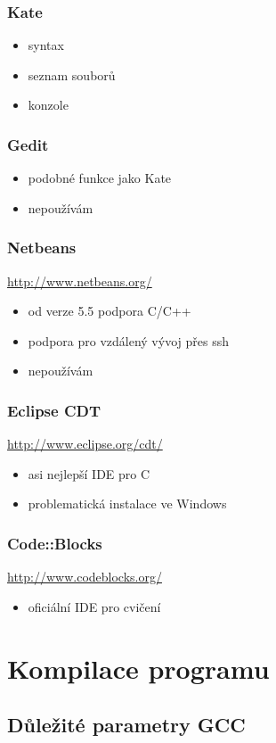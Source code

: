 	\begin{frame}
		\frametitle{Kate}
		\begin{itemize}
			\item{syntax}
			\item{seznam souborů}
			\item{konzole}
		\end{itemize}
	\end{frame}

	\begin{frame}
		\frametitle{Gedit}
		\begin{itemize}
			\item{podobné funkce jako Kate}
			\item{nepoužívám}
		\end{itemize}
	\end{frame}

	\begin{frame}
		\frametitle{Netbeans}
		\href{http://www.netbeans.org/}{http://www.netbeans.org/}
		\begin{itemize}
			\item{od verze 5.5 podpora C/C++}
			\item{podpora pro vzdálený vývoj přes ssh}
			\item{nepoužívám}
		\end{itemize}
	\end{frame}

	\begin{frame}
		\frametitle{Eclipse CDT}
		\href{http://www.eclipse.org/cdt/}{http://www.eclipse.org/cdt/}
		\begin{itemize}
			\item{asi nejlepší IDE pro C}
			\item{problematická instalace ve Windows}
		\end{itemize}
	\end{frame}

	\begin{frame}
		\frametitle{Code::Blocks}
		\href{http://www.codeblocks.org/}{http://www.codeblocks.org/}
		\begin{itemize}
			\item{oficiální IDE pro cvičení}
		\end{itemize}
	\end{frame}

	\section{Kompilace programu}
	\subsection{Důležité parametry GCC}

